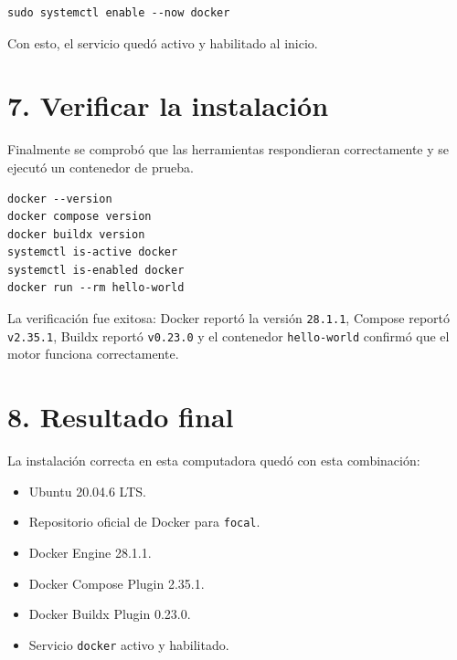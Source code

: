 \documentclass[12pt]{article}
\begin{document}
\begin{verbatim}
sudo systemctl enable --now docker
\end{verbatim}

Con esto, el servicio qued\'o activo y habilitado al inicio.

\section*{7. Verificar la instalaci\'on}
Finalmente se comprob\'o que las herramientas respondieran correctamente y se ejecut\'o un contenedor de prueba.

\begin{verbatim}
docker --version
docker compose version
docker buildx version
systemctl is-active docker
systemctl is-enabled docker
docker run --rm hello-world
\end{verbatim}

La verificaci\'on fue exitosa: Docker report\'o la versi\'on \texttt{28.1.1}, Compose report\'o \texttt{v2.35.1}, Buildx report\'o \texttt{v0.23.0} y el contenedor \texttt{hello-world} confirm\'o que el motor funciona correctamente.

\section*{8. Resultado final}
La instalaci\'on correcta en esta computadora qued\'o con esta combinaci\'on:

\begin{itemize}[leftmargin=*]
  \item Ubuntu 20.04.6 LTS.
  \item Repositorio oficial de Docker para \texttt{focal}.
  \item Docker Engine 28.1.1.
  \item Docker Compose Plugin 2.35.1.
  \item Docker Buildx Plugin 0.23.0.
  \item Servicio \texttt{docker} activo y habilitado.
\end{itemize}
\end{document}
